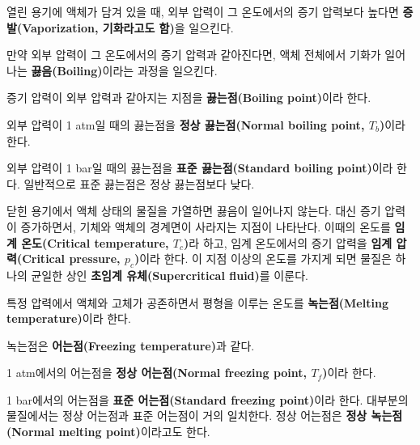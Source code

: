         \begin{defn}[액체-기체 사이의 논의]
        \begin{enum}
        \item 열린 용기에 액체가 담겨 있을 때, 외부 압력이 그 온도에서의 증기 압력보다 높다면 \textbf{증발(Vaporization, 기화라고도 함)}을 일으킨다. 
        \item 만약 외부 압력이 그 온도에서의 증기 압력과 같아진다면, 액체 전체에서 기화가 일어나는 \textbf{끓음(Boiling)}이라는 과정을 일으킨다. 
        \item 증기 압력이 외부 압력과 같아지는 지점을 \textbf{끓는점(Boiling point)}이라 한다.
        \item 외부 압력이 1 atm일 때의 끓는점을 \textbf{정상 끓는점(Normal boiling point, $T_b$)}이라 한다.
        \item 외부 압력이 1 bar일 때의 끓는점을 \textbf{표준 끓는점(Standard boiling point)}이라 한다. 일반적으로 표준 끓는점은 정상 끓는점보다 낮다.
        \end{enum}
        \end{defn}
        \begin{defn}
        닫힌 용기에서 액체 상태의 물질을 가열하면 끓음이 일어나지 않는다. 대신 증기 압력이 증가하면서, 기체와 액체의 경계면이 사라지는 지점이 
        나타난다. 이때의 온도를 \textbf{임계 온도(Critical temperature, $T_c$)}라 하고, 임계 온도에서의 증기 압력을 \textbf{임계 압력(Critical pressure, $p_c$)}이라 
        한다. 이 지점 이상의 온도를 가지게 되면 물질은 하나의 균일한 상인 \textbf{초임계 유체(Supercritical fluid)}를 이룬다.
        \end{defn}
        \begin{defn}[고체-액체 사이의 논의]
        \begin{enum}
        \item 특정 압력에서 액체와 고체가 공존하면서 평형을 이루는 온도를 \textbf{녹는점(Melting temperature)}이라 한다. 
        \item 녹는점은 \textbf{어는점(Freezing temperature)}과 같다. 
        \item 1 atm에서의 어는점을 \textbf{정상 어는점(Normal freezing point, $T_f$)}이라 한다.
        \item 1 bar에서의 어는점을 \textbf{표준 어는점(Standard freezing point)}이라 한다. 
        대부분의 물질에서는 정상 어는점과 표준 어는점이 거의 일치한다. 정상 어는점은 \textbf{정상 녹는점(Normal melting point)}이라고도 한다.
        \end{enum}
        \end{defn}
